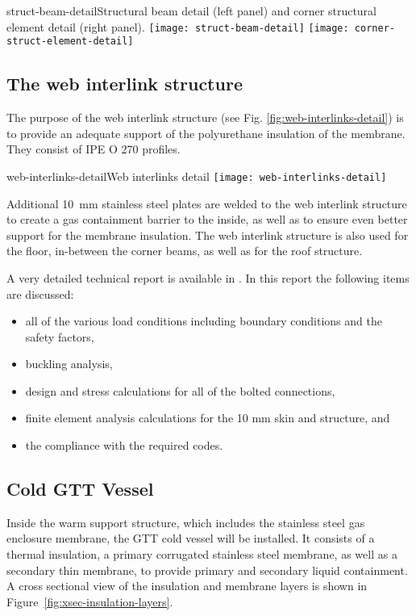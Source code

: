 \begin{cdrfigure}{struct-beam-detail}{Structural beam detail (left panel) and corner structural element detail (right panel).}
  \texttt{[image: struct-beam-detail]}
  \texttt{[image: corner-struct-element-detail]}
\end{cdrfigure}


\subsection{The web interlink structure}

The purpose of the web interlink structure (see Fig. \ref{fig:web-interlinks-detail}) is to provide an adequate support of the polyurethane insulation of the membrane. They consist of IPE O 270 profiles. 
%
\begin{cdrfigure}{web-interlinks-detail}{Web interlinks detail}
  \texttt{[image: web-interlinks-detail]}
\end{cdrfigure}


Additional \SI{10}{mm} stainless steel plates are welded to the web interlink structure to create a gas containment barrier to the inside, as well as to ensure even better support for the membrane insulation. 
The web interlink structure is also used for the floor, in-between the corner beams, as well as for the roof structure.

A very detailed technical report is available in \cite{edms3}.
In this report the following items are discussed:
\begin{itemize}
\item all of the various load conditions including boundary conditions and the safety factors,
\item buckling analysis,
\item design and stress calculations for all of the bolted connections,
\item finite element analysis calculations for the 10 mm skin and structure, and
\item the compliance with the required codes.
\end{itemize}

\subsection{Cold GTT Vessel}

Inside the warm support structure, which includes the stainless steel gas enclosure membrane, the GTT cold vessel will be installed. It consists of a thermal insulation, a primary corrugated stainless steel membrane, as well as a secondary thin membrane, to provide primary and secondary liquid containment. A cross sectional view of the insulation and membrane layers is shown in Figure~\ref{fig:xsec-insulation-layers}.

